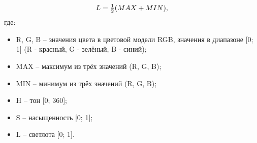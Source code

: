 \documentclass[a4paper,14pt, unknownkeysallowed]{extreport}
\begin{document}
\begin{equation}
	{\label{eq:rgbtohsll}\displaystyle L={\begin{matrix}{\frac {1}{2}}\end{matrix}}(MAX+MIN),}
\end{equation} где:
\begin{itemize}
	\item R, G, B -- значения цвета в цветовой модели RGB, значения в диапазоне [0; 1] (R - красный, G - зелёный, B - синий);
	\item MAX -- максимум из трёх значений (R, G, B);
	\item MIN -- минимум из трёх значений (R, G, B);
	\item H -- тон [0; 360];
	\item S -- насыщенность [0; 1];
	\item L -- светлота [0; 1].
\end{itemize}
\end{document}
